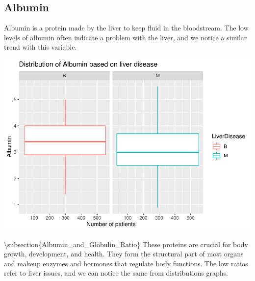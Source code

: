 \documentclass[]{article}
\newenvironment{Shaded}{\begin{snugshade}}{\end{snugshade}}
\newcommand{\CommentTok}[1]{\textcolor[rgb]{0.56,0.35,0.01}{\textit{#1}}}
\newcommand{\DataTypeTok}[1]{\textcolor[rgb]{0.13,0.29,0.53}{#1}}
\newcommand{\KeywordTok}[1]{\textcolor[rgb]{0.13,0.29,0.53}{\textbf{#1}}}
\newcommand{\NormalTok}[1]{#1}
\newcommand{\OperatorTok}[1]{\textcolor[rgb]{0.81,0.36,0.00}{\textbf{#1}}}
\newcommand{\StringTok}[1]{\textcolor[rgb]{0.31,0.60,0.02}{#1}}
\begin{document}
\subsection{Albumin}

Albumin is a protein made by the liver to keep fluid in the bloodstream.
The low levels of albumin often indicate a problem with the liver, and
we notice a similar trend with this variable.

\begin{Shaded}
\end{Shaded}

\includegraphics{LiverDisease_files/figure-latex/unnamed-chunk-20-1.pdf}

\textbackslash subsection\{Albumin\_and\_Globulin\_Ratio\} These
proteins are crucial for body growth, development, and health. They form
the structural part of most organs and makeup enzymes and hormones that
regulate body functions. The low ratios refer to liver issues, and we
can notice the same from distributions graphs.
\end{document}
